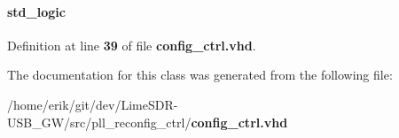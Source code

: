 \paragraph[{stop\+\_\+clk}]{ {\bfseries \textcolor{comment}{std\+\_\+logic}\textcolor{vhdlchar}{ }} \hspace{0.3cm}{\ttfamily [Signal]}}\label{classconfig__ctrl_1_1arch_a3e06a8a897702b5f7520619d453c88d9}


Definition at line {\bf 39} of file {\bf config\+\_\+ctrl.\+vhd}.



The documentation for this class was generated from the following file\+:\begin{DoxyCompactItemize}
\item 
/home/erik/git/dev/\+Lime\+S\+D\+R-\/\+U\+S\+B\+\_\+\+G\+W/src/pll\+\_\+reconfig\+\_\+ctrl/{\bf config\+\_\+ctrl.\+vhd}\end{DoxyCompactItemize}
